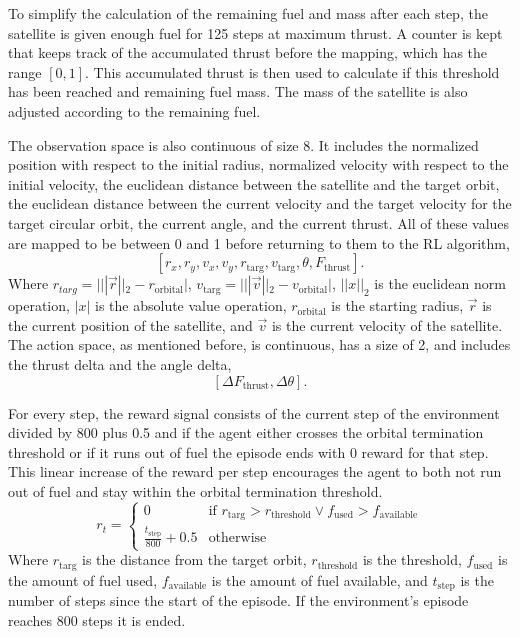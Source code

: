To simplify the calculation of the remaining fuel and mass after each step, the satellite is given enough fuel for 125 steps at maximum thrust. A counter is kept that keeps track of the accumulated thrust before the mapping, which has the range $[0, 1]$. This accumulated thrust is then used to calculate if this threshold has been reached and remaining fuel mass. The mass of the satellite is also adjusted according to the remaining fuel.

The observation space is also continuous of size 8. It includes the normalized position with respect to the initial radius, normalized velocity with respect to the initial velocity, the euclidean distance between the satellite and the target orbit, the euclidean distance between the current velocity and the target velocity for the target circular orbit, the current angle, and the current thrust. All of these values are mapped to be between 0 and 1 before returning to them to the RL algorithm,
$$[r_x, r_y, v_x, v_y, r_{\text{targ}}, v_{\text{targ}}, \theta, F_{\text{thrust}}].$$
Where $r_{targ}=|||\vec{r}||_2 - r_\text{orbital}|$, $v_{\text{targ}}=|||\vec{v}||_2-v_\text{orbital}|$, $||x||_2$ is the euclidean norm operation, $|x|$ is the absolute value operation, $r_\text{orbital}$ is the starting radius, $\vec{r}$ is the current position of the satellite, and $\vec{v}$ is the current velocity of the satellite. The action space, as mentioned before, is continuous, has a size of 2, and includes the thrust delta and the angle delta, $$[\Delta F_{\text{thrust}}, \Delta \theta].$$ 

For every step, the reward signal consists of the current step of the environment divided by 800 plus 0.5 and if the agent either crosses the orbital termination threshold or if it runs out of fuel the episode ends with 0 reward for that step. This linear increase of the reward per step encourages the agent to both not run out of fuel and stay within the orbital termination threshold. $$
r_t = \begin{cases}
	0 & \mbox{if }r_{\text{targ}}>r_{\text{threshold}}\lor f_{\text{used}}>f_{\text{available}} \\
	\frac{t_{\text{step}}}{800} + 0.5 & \mbox{otherwise}
\end{cases}
$$ 
Where $r_{\text{targ}}$ is the distance from the target orbit, $r_{\text{threshold}}$ is the threshold, $f_{\text{used}}$ is the amount of fuel used, $f_{\text{available}}$ is the amount of fuel available, and $t_{\text{step}}$ is the number of steps since the start of the episode. If the environment's episode reaches 800 steps it is ended.

